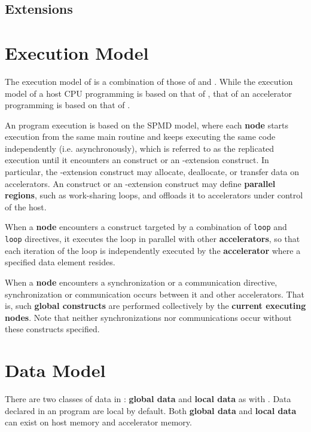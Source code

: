 \subsection{{\OACC} Extensions}

\section{Execution Model}
The execution model of {\XACC} is a combination of those of {\XMP} and {\OACC}.
While the execution model of a host CPU programming is based on that of {\XMP},
that of an accelerator programming is based on that of {\OACC}.

An {\XACC} program execution is based on the SPMD model, 
where each {\bf node} starts execution from the same main routine and keeps executing the same code independently (i.e. asynchronously), 
which is referred to as the replicated execution
until it encounters an {\XMP} construct or an {\XMP}-extension construct.
In particular,
the {\XMP}-extension construct may allocate, deallocate, or transfer data on accelerators.
An {\OACC} construct or an {\OACC}-extension construct may define {\bf parallel regions}, such as work-sharing loops, 
and offloads it to accelerators under control of the host.

When a {\bf node} encounters a construct 
targeted by a combination of {\XMP} {\tt loop} and {\OACC} {\tt loop} directives,
it executes the loop in parallel with other {\bf accelerators},
so that each iteration of the loop is independently executed by the {\bf accelerator}
where a specified data element resides.

When a {\bf node} encounters a {\XACC} synchronization or a {\XACC} communication directive,
synchronization or communication occurs between it and other accelerators.
That is, such {\bf global constructs} are performed collectively by the {\bf current executing nodes}.
Note that neither synchronizations nor communications occur without these constructs specified.

\section{Data Model}
There are two classes of data in {\XACC}: {\bf global data} and {\bf local data} as with {\XMP}. 
Data declared in an {\XACC} program are local by default.
Both {\bf global data} and {\bf local data} can exist on host memory and accelerator memory.

